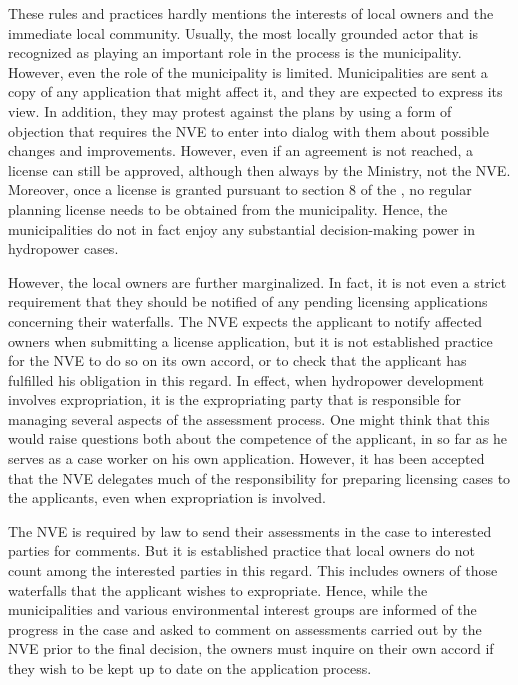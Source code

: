 These rules and practices hardly mentions the interests of local owners and the immediate local community. Usually, the most locally grounded actor that is recognized as playing an important role in the process is the municipality. However, even the role of the municipality is limited. Municipalities are sent a copy of any application that might affect it, and they are expected to express its view. In addition, they may protest against the plans by using a form of objection that requires the NVE to enter into dialog with them about possible changes and improvements. However, even if an agreement is not reached, a license can still be approved, although then always by the Ministry, not the NVE. Moreover, once a license is granted pursuant to section 8 of the \cite{wra00}, no regular planning license needs to be obtained from the municipality. Hence, the municipalities do not in fact enjoy any substantial decision-making power in hydropower cases.

However, the local owners are further marginalized. In fact, it is not even a strict requirement that they should be notified of any pending licensing applications concerning their waterfalls. The NVE expects the applicant to notify affected owners when submitting a license application, but it is not established practice for the NVE to do so on its own accord, or to check that the applicant has fulfilled his obligation in this regard. In effect, when hydropower development involves expropriation, it is the expropriating party that is responsible for managing several aspects of the assessment process. One might think that this would raise questions both about the competence of the applicant, in so far as he serves as a case worker on his own application. However, it has been accepted that the NVE delegates much of the responsibility for preparing licensing cases to the applicants, even when expropriation is involved. 

The NVE is required by law to send their assessments in the case to interested parties for comments. But it is established practice that local owners do not count among the interested parties in this regard. This includes owners of those waterfalls that the applicant wishes to expropriate. Hence, while the municipalities and various environmental interest groups are informed of the progress in the case and asked to comment on assessments carried out by the NVE prior to the final decision, the owners must inquire on their own accord if they wish to be kept up to date on the application process. 

